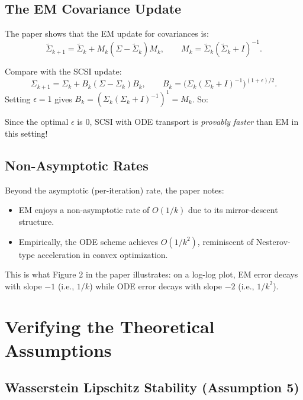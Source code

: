 \documentclass[11pt, a4paper]{article}
\theoremstyle{definition}
\begin{document}
\subsection{The EM Covariance Update}

The paper shows that the EM update for covariances is:
\[
    \tilde{\Sigma}_{k+1} = \tilde{\Sigma}_k + M_k(\Sigma - \tilde{\Sigma}_k)M_k, \qquad M_k = \tilde{\Sigma}_k(\tilde{\Sigma}_k + I)^{-1}.
\]

\begin{keyidea}
Compare with the SCSI update:
\[
    \Sigma_{k+1} = \Sigma_k + B_k(\Sigma - \Sigma_k)B_k, \qquad B_k = \bigl(\Sigma_k(\Sigma_k+I)^{-1}\bigr)^{(1+\epsilon)/2}.
\]
Setting $\epsilon = 1$ gives $B_k = (\Sigma_k(\Sigma_k+I)^{-1})^1 = M_k$. So:
\begin{center}
\end{center}
Since the optimal $\epsilon$ is 0, SCSI with ODE transport is \emph{provably faster} than EM in this setting!
\end{keyidea}

\subsection{Non-Asymptotic Rates}

Beyond the asymptotic (per-iteration) rate, the paper notes:
\begin{itemize}
    \item EM enjoys a non-asymptotic rate of $O(1/k)$ due to its mirror-descent structure.
    \item Empirically, the ODE scheme achieves $O(1/k^2)$, reminiscent of Nesterov-type acceleration in convex optimization.
\end{itemize}
This is what Figure 2 in the paper illustrates: on a log-log plot, EM error decays with slope $-1$ (i.e., $1/k$) while ODE error decays with slope $-2$ (i.e., $1/k^2$).

\section{Verifying the Theoretical Assumptions}

\subsection{Wasserstein Lipschitz Stability (Assumption 5)}
\end{document}
